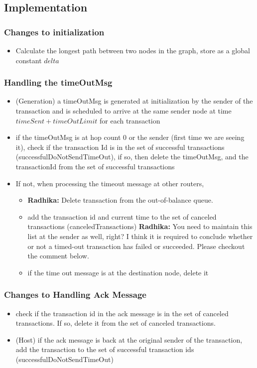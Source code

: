 \documentclass[a4paper]{article}
\newcommand{\radhika}[1]{{\color{red} \textbf{Radhika:} {#1}}}
\begin{document}
\subsection{Implementation}
\subsubsection{ Changes to initialization}
    \begin{itemize}
        \item Calculate the longest path between two nodes in the graph, store as a global constant $delta$
    \end{itemize}

\subsubsection{ Handling the timeOutMsg}
    \begin{itemize}
        \item (Generation) a timeOutMsg is generated at initialization by the sender of the transaction and is scheduled to arrive at the same sender node at time $timeSent + timeOutLimit$  for each transaction
        \item if the timeOutMsg is at hop count 0 or the sender (first time we are seeing it), check if the transaction Id is in the set of successful transactions (successfulDoNotSendTimeOut), if so, then delete the timeOutMsg, and the transactionId from the set of successful transactions
        \item If not, when processing the timeout message at other routers, 
        \begin{itemize}
						\item \radhika{Delete transaction from the out-of-balance queue.}
            \item add the transaction id and current time to the set of canceled transactions (canceledTransactions)
							\radhika{You need to maintain this list at the sender as well, right? I think it is required to conclude whether or not a timed-out transaction has failed or succeeded. Please checkout the comment below.} 
            \item if the time out message is at the destination node, delete it
        \end{itemize}
    \end{itemize}
\subsubsection{ Changes to Handling Ack Message}
    \begin{itemize}
        \item check if the transaction id in the ack message is in the set of canceled transactions. If so, delete it from the set of canceled transactions.
        \item (Host) if the ack message is back at the original sender of the transaction, add the transaction to the set of successful transaction ids (successfulDoNotSendTimeOut)

    \end{itemize}
\end{document}
